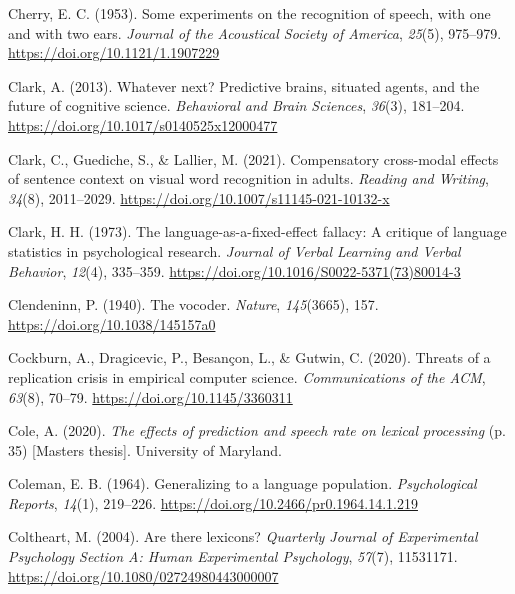 \documentclass[a4paper, nobind]{templates/ociamthesis}
\newlength{\cslhangindent}
\newenvironment{CSLReferences}[2] %
 {%
  \setlength{\parindent}{0pt}
  \ifodd #1
  \let\oldpar\par
  \def\par{\hangindent=\cslhangindent\oldpar}
  \fi
  \setlength{\parskip}{1mm}
  \setlength{\baselineskip}{6mm}
 }%
 {}
\begin{document}
\begin{CSLReferences}{1}{0}
\leavevmode{}%
Cherry, E. C. (1953). {Some experiments on the recognition of speech, with one and with two ears}. \emph{Journal of the Acoustical Society of America}, \emph{25}(5), 975--979. \url{https://doi.org/10.1121/1.1907229}

\leavevmode{}%
Clark, A. (2013). Whatever next? Predictive brains, situated agents, and the future of cognitive science. \emph{Behavioral and Brain Sciences}, \emph{36}(3), 181--204. \url{https://doi.org/10.1017/s0140525x12000477}

\leavevmode{}%
Clark, C., Guediche, S., \& Lallier, M. (2021). {Compensatory cross-modal effects of sentence context on visual word recognition in adults}. \emph{Reading and Writing}, \emph{34}(8), 2011--2029. \url{https://doi.org/10.1007/s11145-021-10132-x}

\leavevmode{}%
Clark, H. H. (1973). {The language-as-a-fixed-effect fallacy: A critique of language statistics in psychological research}. \emph{Journal of Verbal Learning and Verbal Behavior}, \emph{12}(4), 335--359. \url{https://doi.org/10.1016/S0022-5371(73)80014-3}

\leavevmode{}%
Clendeninn, P. (1940). {The vocoder}. \emph{Nature}, \emph{145}(3665), 157. \url{https://doi.org/10.1038/145157a0}

\leavevmode{}%
Cockburn, A., Dragicevic, P., Besançon, L., \& Gutwin, C. (2020). {Threats of a replication crisis in empirical computer science}. \emph{Communications of the ACM}, \emph{63}(8), 70--79. \url{https://doi.org/10.1145/3360311}

\leavevmode{}%
Cole, A. (2020). \emph{{The effects of prediction and speech rate on lexical processing}} (p. 35) {[}Masters thesis{]}. University of Maryland.

\leavevmode{}%
Coleman, E. B. (1964). {Generalizing to a language population}. \emph{Psychological Reports}, \emph{14}(1), 219--226. \url{https://doi.org/10.2466/pr0.1964.14.1.219}

\leavevmode{}%
Coltheart, M. (2004). Are there lexicons? \emph{Quarterly Journal of Experimental Psychology Section A: Human Experimental Psychology}, \emph{57}(7), 11531171. \url{https://doi.org/10.1080/02724980443000007}


\end{CSLReferences}
\end{document}
